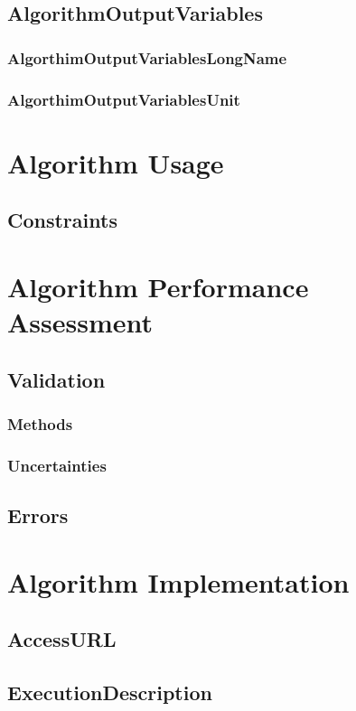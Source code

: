 \documentclass[12pt]{article}
\begin{document}
\subsection{AlgorithmOutputVariables}
\AlgorithmOutputVariables

\subsubsection{AlgorthimOutputVariablesLongName}
\AlgorthimOutputVariablesLongName

\subsubsection{AlgorthimOutputVariablesUnit}
\AlgorthimOutputVariablesUnit

\section{Algorithm Usage}
\AlgorithmUsage

\subsection{Constraints}
\Constraints

\section{Algorithm Performance Assessment}
\AlgorithmPerformanceAssessment

\subsection{Validation}
\subsubsection{Methods}
\Methods
\subsubsection{Uncertainties}
\Uncertainties
\subsection{Errors}
\Errors

\section{Algorithm Implementation}
\AlgorithmImplementation
\subsection{AccessURL}
\AccessURL
\subsection{ExecutionDescription}
\ExecutionDescription



\end{document}
